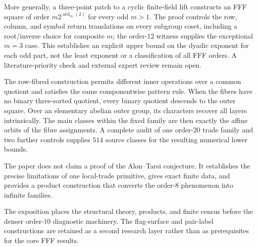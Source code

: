 More generally, a three-point patch to a cyclic finite-field lift constructs
an FFF square of order $m2^{\operatorname{ord}_m(2)}$ for every odd $m>1$.
The proof controls the row, column, and symbol return translations on every
subgroup coset, including a root/inverse choice for composite $m$; the
order-$12$ witness supplies the exceptional $m=3$ case.  This establishes an
explicit upper bound on the dyadic exponent for each odd part, not the least
exponent or a classification of all FFF orders.  A literature-priority check
and external expert review remain open.

The row-fibred construction permits different inner operations over a
common quotient and satisfies the same componentwise pattern rule.
When the fibres have no binary three-sorted quotient, every binary
quotient descends to the outer square. Over an elementary abelian
outer group, its characters recover all layers intrinsically.
The main classes within the fixed family are then exactly the
affine orbits of the fibre assignments. A complete audit of one
order-$20$ trade family and two further controls supplies $514$
source classes for the resulting numerical lower bounds.

The paper does not claim a proof of the Alon--Tarsi conjecture. It establishes
the precise limitations of one local-trade primitive, gives exact finite
data, and provides a product construction that converts the order-$8$
phenomenon into infinite families.

The exposition places the structural theory, products, and finite census
before the denser order-$10$ diagnostic machinery.  The flag-surface and
pair-label constructions are retained as a second research layer rather than
as prerequisites for the core FFF results.
